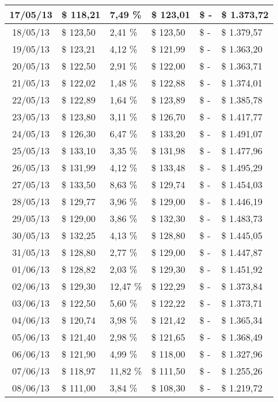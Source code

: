 \begin{small}
\begin{longtable}{|c|l|l|l|l|l|}
17/05/13 & \$ 118,21 & 7,49 \% & \$ 123,01 & \$ - & \$ 1.373,72 \\ \hline
18/05/13 & \$ 123,50 & 2,41 \% & \$ 123,50 & \$ - & \$ 1.379,57 \\ \hline
19/05/13 & \$ 123,21 & 4,12 \% & \$ 121,99 & \$ - & \$ 1.363,20 \\ \hline
20/05/13 & \$ 122,50 & 2,91 \% & \$ 122,00 & \$ - & \$ 1.363,71 \\ \hline
21/05/13 & \$ 122,02 & 1,48 \% & \$ 122,88 & \$ - & \$ 1.374,01 \\ \hline
22/05/13 & \$ 122,89 & 1,64 \% & \$ 123,89 & \$ - & \$ 1.385,78 \\ \hline
23/05/13 & \$ 123,80 & 3,11 \% & \$ 126,70 & \$ - & \$ 1.417,77 \\ \hline
24/05/13 & \$ 126,30 & 6,47 \% & \$ 133,20 & \$ - & \$ 1.491,07 \\ \hline
25/05/13 & \$ 133,10 & 3,35 \% & \$ 131,98 & \$ - & \$ 1.477,96 \\ \hline
26/05/13 & \$ 131,99 & 4,12 \% & \$ 133,48 & \$ - & \$ 1.495,29 \\ \hline
27/05/13 & \$ 133,50 & 8,63 \% & \$ 129,74 & \$ - & \$ 1.454,03 \\ \hline
28/05/13 & \$ 129,77 & 3,96 \% & \$ 129,00 & \$ - & \$ 1.446,19 \\ \hline
29/05/13 & \$ 129,00 & 3,86 \% & \$ 132,30 & \$ - & \$ 1.483,73 \\ \hline
30/05/13 & \$ 132,25 & 4,13 \% & \$ 128,80 & \$ - & \$ 1.445,05 \\ \hline
31/05/13 & \$ 128,80 & 2,77 \% & \$ 129,00 & \$ - & \$ 1.447,87 \\ \hline
01/06/13 & \$ 128,82 & 2,03 \% & \$ 129,30 & \$ - & \$ 1.451,92 \\ \hline
02/06/13 & \$ 129,30 & 12,47 \% & \$ 122,29 & \$ - & \$ 1.373,84 \\ \hline
03/06/13 & \$ 122,50 & 5,60 \% & \$ 122,22 & \$ - & \$ 1.373,71 \\ \hline
04/06/13 & \$ 120,74 & 3,98 \% & \$ 121,42 & \$ - & \$ 1.365,34 \\ \hline
05/06/13 & \$ 121,40 & 2,98 \% & \$ 121,65 & \$ - & \$ 1.368,49 \\ \hline
06/06/13 & \$ 121,90 & 4,99 \% & \$ 118,00 & \$ - & \$ 1.327,96 \\ \hline
07/06/13 & \$ 118,97 & 11,82 \% & \$ 111,50 & \$ - & \$ 1.255,26 \\ \hline
08/06/13 & \$ 111,00 & 3,84 \% & \$ 108,30 & \$ - & \$ 1.219,72 \\ \hline

\end{longtable}
\end{small}
